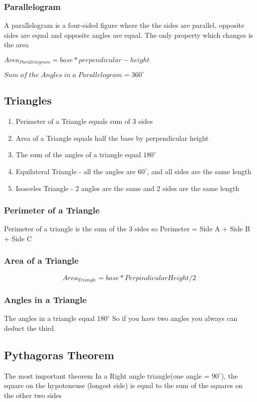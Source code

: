 \documentclass{article}
\begin{document}
\subsubsection{Parallelogram}
A parallelogram is a four-sided figure where the the sides are parallel, opposite sides are equal and opposite angles are equal.
The only property which changes is the area

$Area_{Parallelogram} = base * perpendicular-height$

$Sum\;of\;the\;Angles\;in\;a\;Parallelogram  = 360^{\circ}$


\newpage
\subsection{Triangles}
\begin{enumerate}
\item Perimeter of a Triangle equals sum of 3 sides
\item Area of a Triangle equals half the base by perpendicular height
\item The sum of the angles of a triangle equal $180^{\circ}$
\item Equilateral Triangle - all the angles are $60^{\circ}$, and all sides are the same length
\item Isosceles Triangle - 2 angles are the same and 2 sides are the same length
\end{enumerate}
\subsubsection{Perimeter of a Triangle}
Perimeter of a triangle is the sum of the 3 sides so
Perimeter = Side A + Side B + Side C
\subsubsection{Area of a Triangle}
\begin{equation}
Area_{Triangle} = base * Perpindicular Height / 2
\end{equation}
\subsubsection{Angles in a Triangle}
The angles in a triangle equal $180^{\circ}$
So if you have two angles you always can deduct the third.
\newpage
\subsection{Pythagoras Theorem}
The most important theorem In a Right angle triangle(one angle = $90^{\circ}$), the square on the hypoteneuse (longest side) is equal to the sum of the squares on the other two sides
\end{document}
